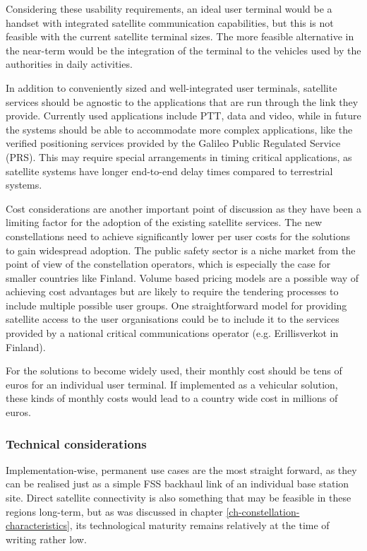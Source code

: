 \documentclass[english, 12pt, a4paper, elec, utf8, a-1b, online]{aaltothesis}
\begin{document}
Considering these usability requirements, an ideal user terminal would be a handset with integrated satellite communication capabilities, but this is not feasible with the current satellite terminal sizes. The more feasible alternative in the near-term would be the integration of the terminal to the vehicles used by the authorities in daily activities.

In addition to conveniently sized and well-integrated user terminals, satellite services should be agnostic to the applications that are run through the link they provide. Currently used applications include PTT, data and video, while in future the systems should be able to accommodate more complex applications, like the verified positioning services provided by the Galileo Public Regulated Service (PRS). This may require special arrangements in timing critical applications, as satellite systems have longer end-to-end delay times compared to terrestrial systems.

Cost considerations are another important point of discussion as they have been a limiting factor for the adoption of the existing satellite services. The new constellations need to achieve significantly lower per user costs for the solutions to gain widespread adoption. The public safety sector is a niche market from the point of view of the constellation operators, which is especially the case for smaller countries like Finland. Volume based pricing models are a possible way of achieving cost advantages but are likely to require the tendering processes to include multiple possible user groups. One straightforward model for providing satellite access to the user organisations could be to include it to the services provided by a national critical communications operator (e.g. Erillisverkot in Finland).

For the solutions to become widely used, their monthly cost should be tens of euros for an individual user terminal. If implemented as a vehicular solution, these kinds of monthly costs would lead to a country wide cost in millions of euros.

\subsubsection{Technical considerations}

Implementation-wise, permanent use cases are the most straight forward, as they can be realised just as a simple FSS backhaul link of an individual base station site.
Direct satellite connectivity is also something that may be feasible in these regions long-term, but as was discussed in chapter \ref{ch-constellation-characteristics}, its technological maturity remains relatively at the time of writing rather low. 
\end{document}
